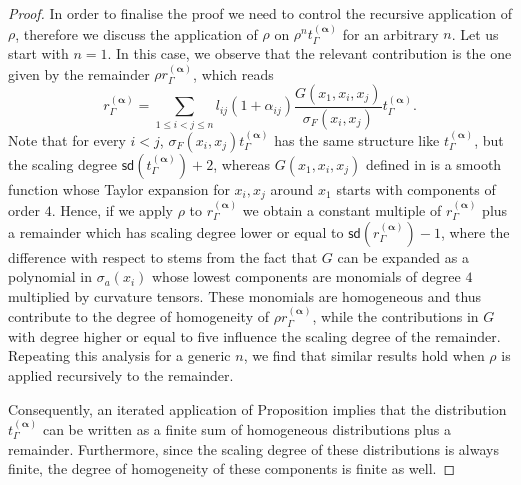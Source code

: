 \documentclass[10pt]{book}
\newcommand{\sd}{\mathsf{sd}}
\theoremstyle{break}
\begin{document}
\begin{proof}
In order to finalise the proof we need to control the recursive application of $\rho$, therefore we discuss the application of $\rho$ on $\rho^nt_\Gamma^{(\boldsymbol{\alpha})}$ for an arbitrary $n$. 
Let us start with $n=1$. In this case, we observe that the relevant contribution is the one given by the remainder $\rho r^{(\boldsymbol{\alpha})}_\Gamma$, which reads 
\[
r^{(\boldsymbol{\alpha})}_\Gamma = \sum_{1\leq i < j \leq n} l_{ij}(1+ \alpha_{ij}) \frac{G(x_1,x_i,x_j)}{\sigma_F(x_i,x_j)}t_\Gamma^{(\boldsymbol{\alpha})}.
\]
Note that for every $i<j$, $\sigma_F(x_i,x_j)t_\Gamma^{(\boldsymbol{\alpha})}$ has the same structure like $t_\Gamma^{(\boldsymbol{\alpha})}$, but the scaling degree $\sd(t_\Gamma^{(\boldsymbol{\alpha})}) +2$, whereas $G(x_1,x_i,x_j)$ defined in %
is a smooth function whose Taylor expansion for $x_i, x_j$ around $x_1$ starts with components of order $4$. Hence, if we apply $\rho$ to $r^{(\boldsymbol{\alpha})}_\Gamma$ we obtain
a constant multiple of $r^{(\boldsymbol{\alpha})}_\Gamma$ plus a remainder which has scaling degree lower or equal to $\sd(r^{(\boldsymbol{\alpha})}_\Gamma)-1$, where the difference with respect to %
stems from the fact that $G$ can be expanded as a polynomial in $\sigma_a(x_i)$ whose lowest components are monomials of degree $4$ multiplied by curvature tensors. These monomials are homogeneous and thus contribute to the degree of homogeneity of $\rho r^{(\boldsymbol{\alpha})}_\Gamma$, while the contributions in $G$ with degree higher or equal to five influence the scaling degree of the remainder.
Repeating this analysis for a generic $n$, we find that similar results hold when $\rho$ is applied recursively to the remainder.

Consequently, an iterated application of Proposition %
implies that the distribution $t_\Gamma^{(\boldsymbol{\alpha})}$ can be written as a finite sum of homogeneous distributions plus a remainder. Furthermore, since the scaling degree of these distributions is always finite, the degree of homogeneity of these components is finite as well. 
\end{proof}
\end{document}

